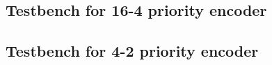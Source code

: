 \documentclass[journal, onecolumn]{IEEEtran}
\begin{document}
\subsection{Testbench for 16-4 priority encoder}



\subsection{Testbench for 4-2 priority encoder}


\end{document}
